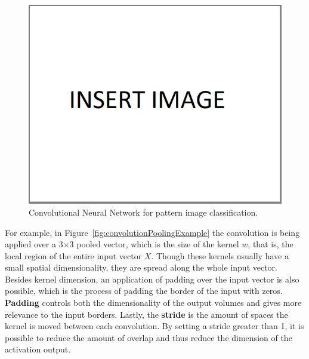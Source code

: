 \begin{figure}[!h]
    \centering
    \includegraphics[scale=.45]{imagenes/insertImage.png}
    \caption{Convolutional Neural Network for pattern image classification.}
    \label{fig:convNet}
\end{figure}

For example, in Figure~\ref{fig:convolutionPoolingExample} the convolution is being applied 
over a 3$\times$3 pooled vector, which is the size of the kernel $w$, that is, the local 
region of the entire input vector $X$. Though these kernels usually have a small spatial 
dimensionality, they are spread along the whole input vector. Besides kernel dimension, an 
application of padding over the input vector is also possible, which is the process of 
padding the border of the input with zeros. \textbf{Padding} controls both the dimensionality 
of the output volumes and gives more relevance to the input borders. Lastly, the 
\textbf{stride} is the amount of spaces the kernel is moved between each convolution. By 
setting a stride greater than 1, it is possible to reduce the amount of overlap and thus 
reduce the dimension of the activation output.

